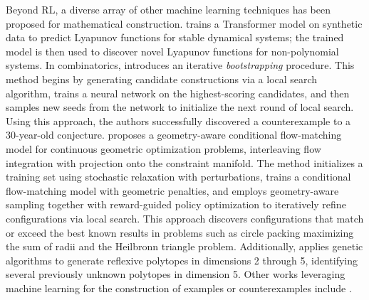 \documentclass[11pt]{article}
\numberwithin{equation}{section}
\begin{document}
Beyond RL, a diverse array of other machine learning techniques has been proposed for mathematical construction. \cite{alfarano2024global} trains a Transformer model on synthetic data to predict Lyapunov functions for stable dynamical systems; the trained model is then used to discover novel Lyapunov functions for non-polynomial systems. In combinatorics, \cite{charton2024patternboost} introduces an iterative \textit{bootstrapping} procedure. This method begins by generating candidate constructions via a local search algorithm, trains a neural network on the highest-scoring candidates, and then samples new seeds from the network to initialize the next round of local search. Using this approach, the authors successfully discovered a counterexample to a 30-year-old conjecture. \cite{bérczi2026flowbasedextremalmathematicalstructure} proposes a geometry-aware conditional flow-matching model for continuous geometric optimization problems, interleaving flow integration with projection onto the constraint manifold. The method initializes a training set using stochastic relaxation with perturbations, trains a conditional flow-matching model with geometric penalties, and employs geometry-aware sampling together with reward-guided policy optimization to iteratively refine configurations via local search. This approach discovers configurations that match or exceed the best known results in problems such as circle packing maximizing the sum of radii and the Heilbronn triangle problem. Additionally, \cite{BERGLUND2024138504} applies genetic algorithms to generate reflexive polytopes in dimensions 2 through 5, identifying several previously unknown polytopes in dimension 5. Other works leveraging machine learning for the construction of examples or counterexamples include \cite{chervov2025cayleypy, chervov2025machine, Gukov_2025,swirszcz2025advancing,douglas2025diffusion}.
\end{document}
